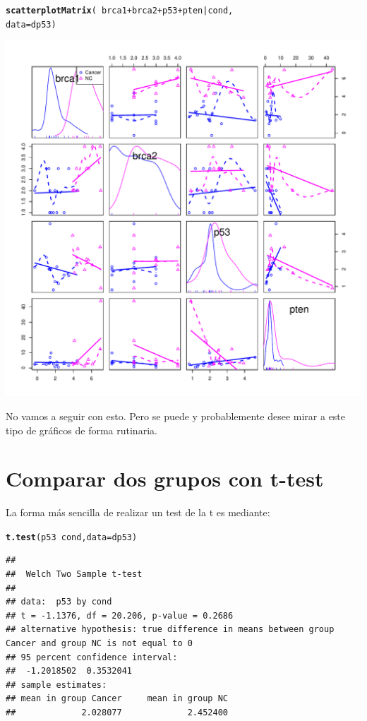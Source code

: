 \documentclass{config/apuntes}\usepackage[]{graphicx}\usepackage[]{xcolor}
\makeatletter
\def\maxwidth{ %
  \ifdim\Gin@nat@width>\linewidth
    \linewidth
  \else
    \Gin@nat@width
  \fi
}
\newcommand{\hlopt}[1]{\textcolor[rgb]{0,0,0}{#1}}%
\newcommand{\hldef}[1]{\textcolor[rgb]{0.345,0.345,0.345}{#1}}%
\newcommand{\hlkwc}[1]{\textcolor[rgb]{0.333,0.667,0.333}{#1}}%
\newcommand{\hlkwd}[1]{\textcolor[rgb]{0.737,0.353,0.396}{\textbf{#1}}}%
\newenvironment{kframe}{%
 \def\at@end@of@kframe{}%
 \ifinner\ifhmode%
  \def\at@end@of@kframe{\end{minipage}}%
  \begin{minipage}{\columnwidth}%
 \fi\fi%
 \def\FrameCommand##1{\hskip\@totalleftmargin \hskip-\fboxsep
 \colorbox{shadecolor}{##1}\hskip-\fboxsep
     \hskip-\linewidth \hskip-\@totalleftmargin \hskip\columnwidth}%
 \MakeFramed {\advance\hsize-\width
   \@totalleftmargin\z@ \linewidth\hsize
   \@setminipage}}%
 {\par\unskip\endMakeFramed%
 \at@end@of@kframe}
\newenvironment{knitrout}{}{} %
\makeatother
\begin{document}
\begin{knitrout}
\color{fgcolor}\begin{kframe}
\begin{alltt}
\hlkwd{scatterplotMatrix}\hldef{(} \hlopt{~} \hldef{brca1} \hlopt{+} \hldef{brca2} \hlopt{+} \hldef{p53} \hlopt{+} \hldef{pten} \hlopt{|} \hldef{cond,}
                  \hlkwc{data} \hldef{= dp53)}
\end{alltt}
\end{kframe}
\includegraphics[width=\maxwidth]{figure/unnamed-chunk-132-1} 
\end{knitrout}

No vamos a seguir con esto. Pero se puede y probablemente desee mirar a este tipo de gráficos de forma rutinaria.

\section{Comparar dos grupos con t-test}
La forma más sencilla de realizar un test de la t es mediante:
\begin{knitrout}
\color{fgcolor}\begin{kframe}
\begin{alltt}
\hlkwd{t.test}\hldef{(p53} \hlopt{~} \hldef{cond,} \hlkwc{data} \hldef{= dp53)}
\end{alltt}
\begin{verbatim}
## 
## 	Welch Two Sample t-test
## 
## data:  p53 by cond
## t = -1.1376, df = 20.206, p-value = 0.2686
## alternative hypothesis: true difference in means between group Cancer and group NC is not equal to 0
## 95 percent confidence interval:
##  -1.2018502  0.3532041
## sample estimates:
## mean in group Cancer     mean in group NC 
##             2.028077             2.452400
\end{verbatim}
\end{kframe}
\end{knitrout}
\end{document}

